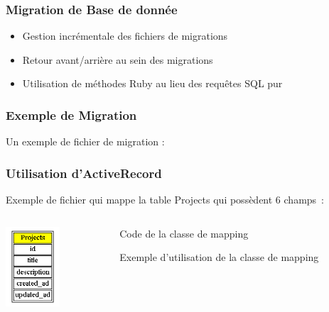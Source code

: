 \documentclass{beamer}
\begin{document}
\begin{frame}
    \frametitle{Migration de Base de donnée}
    \begin{itemize}
        \item Gestion incrémentale des fichiers de migrations
        \item Retour avant/arrière au sein des migrations
        \item Utilisation de méthodes Ruby au lieu des requêtes SQL pur
    \end{itemize}
\end{frame}
\begin{frame}
    \frametitle{Exemple de Migration}

    Un exemple de fichier de migration :


    \begin{center}
        
    \end{center}
\end{frame}

\begin{frame}
    \frametitle{Utilisation d'ActiveRecord}
    Exemple de fichier qui mappe la table Projects qui possèdent 6 champs~:
   
    \begin{columns}
        \begin{column}[l]{3cm}
            \includegraphics[width=20mm]{project.png}
        \end{column}
        
        \begin{column}[r]{10cm}
            \begin{block}{Code de la classe de mapping}
                      
            \end{block}
            \begin{block}{Exemple d'utilisation de la classe de mapping}
                      
            \end{block}
        \end{column}
    \end{columns}

\end{frame}
\end{document}
